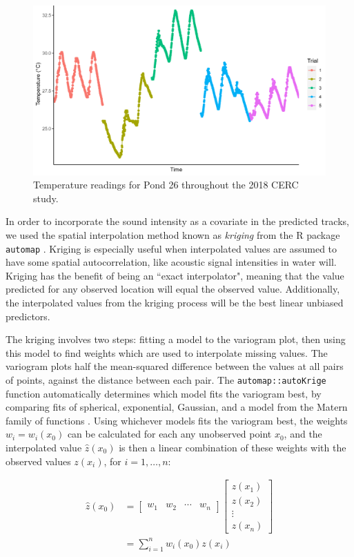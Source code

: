 \documentclass[12pt]{article}
\begin{document}
			\begin{figure}
				\includegraphics[width=\textwidth]{pond_26_temp.png}
				\caption{Temperature readings for Pond 26 throughout the 2018 CERC study.}
				\label{img:temperature}
			\end{figure}
		
			In order to incorporate the sound intensity as a covariate in the predicted tracks, we used the spatial interpolation method known as \emph{kriging} from the R package \texttt{automap} \cite{Hiemstra2008}. Kriging is especially useful when interpolated values are assumed to have some spatial autocorrelation, like acoustic signal intensities in water will. Kriging has the benefit of being an ``exact interpolator", meaning that the value predicted for any observed location will equal the observed value. Additionally, the interpolated values from the kriging process will be the best linear unbiased predictors.
			
			The kriging involves two steps: fitting a model to the variogram plot, then using this model to find weights which are used to interpolate missing values. The variogram plots half the mean-squared difference between the values at all pairs of points, against the distance between each pair. The \texttt{automap::autoKrige} function automatically determines which model fits the variogram best, by comparing fits of spherical, exponential, Gaussian, and a model from the Matern family of functions \cite{Hiemstra2008}. Using whichever models fits the variogram best, the weights $w_i = w_i(x_0)$ can be calculated for each any unobserved point $x_0$, and the interpolated value $\hat z(x_0)$ is then a linear combination of these weights with the observed values $z(x_i)$, for $i = 1, \ldots, n$:
			
			\begin{align*}
				\hat z(x_0) &= \begin{bmatrix} w_1 & w_2 & \cdots & w_n \end{bmatrix} \begin{bmatrix} z(x_1) \\ z(x_2) \\ \vdots \\ z(x_n) \end{bmatrix} \\
				&= \sum_{i = 1}^n w_i(x_0) z(x_i)
			\end{align*}
			
\end{document}
